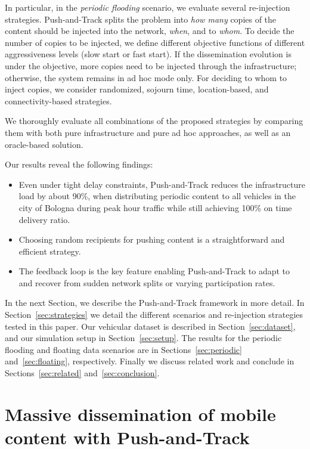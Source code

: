 \documentclass[preprint]{elsarticle}
\begin{document}
In particular, in the \textit{periodic flooding} scenario, we evaluate several re-injection strategies. Push-and-Track splits the problem into \textit{how many} copies of the content should be injected into the network, \textit{when}, and to \textit{whom}. To decide the number of copies to be injected, we define different objective functions of different aggressiveness levels (slow start or fast start). If the dissemination evolution is under the objective, more copies need to be injected through the infrastructure; otherwise, the system remains in ad hoc mode only. For deciding to whom to inject copies, we consider randomized, sojourn time, location-based, and connectivity-based strategies.

We thoroughly evaluate all combinations of the proposed strategies by comparing them with both pure infrastructure and pure ad hoc approaches, as well as an oracle-based solution.

Our results reveal the following findings:

\begin{itemize}

    \item Even under tight delay constraints, Push-and-Track reduces the infrastructure load by about 90\%, when distributing periodic content to all vehicles in the city of Bologna during peak hour traffic while still achieving 100\% on time delivery ratio.

    \item Choosing random recipients for pushing content is a straightforward and efficient strategy.

    \item The feedback loop is the key feature enabling Push-and-Track to adapt to and recover from sudden network splits or varying participation rates.

\end{itemize}

In the next Section, we describe the Push-and-Track framework in more detail. In Section~\ref{sec:strategies} we detail the different scenarios and re-injection strategies tested in this paper. Our vehicular dataset is described in Section~\ref{sec:dataset}, and our simulation setup in Section~\ref{sec:setup}. The results for the periodic flooding and floating data scenarios are in Sections~\ref{sec:periodic} and~\ref{sec:floating}, respectively. Finally we discuss related work and conclude in Sections~\ref{sec:related} and~\ref{sec:conclusion}.


\section{Massive dissemination of mobile content with Push-and-Track}
\label{sec:problem}
\end{document}
